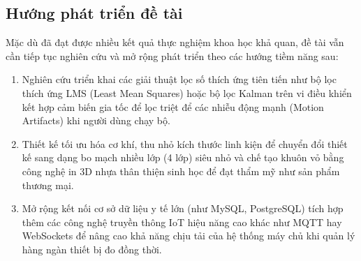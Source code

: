 \subsection*{Hướng phát triển đề tài}
Mặc dù đã đạt được nhiều kết quả thực nghiệm khoa học khả quan, đề tài vẫn cần tiếp tục nghiên cứu và mở rộng phát triển theo các hướng tiềm năng sau:
\begin{enumerate}
    \item Nghiên cứu triển khai các giải thuật lọc số thích ứng tiên tiến như bộ lọc thích ứng LMS (Least Mean Squares) hoặc bộ lọc Kalman trên vi điều khiển kết hợp cảm biến gia tốc để lọc triệt để các nhiễu động mạnh (Motion Artifacts) khi người dùng chạy bộ.
    \item Thiết kế tối ưu hóa cơ khí, thu nhỏ kích thước linh kiện để chuyển đổi thiết kế sang dạng bo mạch nhiều lớp (4 lớp) siêu nhỏ và chế tạo khuôn vỏ bằng công nghệ in 3D nhựa thân thiện sinh học để đạt thẩm mỹ như sản phẩm thương mại.
    \item Mở rộng kết nối cơ sở dữ liệu y tế lớn (như MySQL, PostgreSQL) tích hợp thêm các công nghệ truyền thông IoT hiệu năng cao khác như MQTT hay WebSockets để nâng cao khả năng chịu tải của hệ thống máy chủ khi quản lý hàng ngàn thiết bị đo đồng thời.
\end{enumerate}
